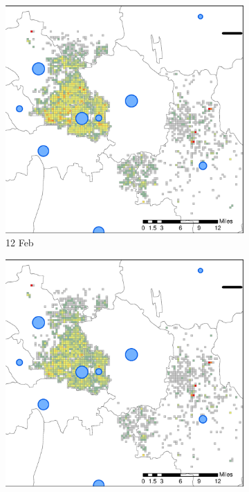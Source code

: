 \documentclass[preprints,ijgi,submit,moreauthors]{Definitions/mdpi}
\begin{document}
\begin{figure}[H]
    \centering
    \begin{subfigure}{.3\textwidth}
        \includegraphics[width=\textwidth]{Figures/Relation_with_confrimed_cases/NewDistrictSSBD2020_02_12.eps}
        \caption{12 Feb}
    \end{subfigure}
    \begin{subfigure}{.3\textwidth}
        \includegraphics[width=\textwidth]{Figures/Relation_with_confrimed_cases/NewDistrictSSBD2020_02_16.eps}

\end{subfigure}
\end{figure}
\end{document}
